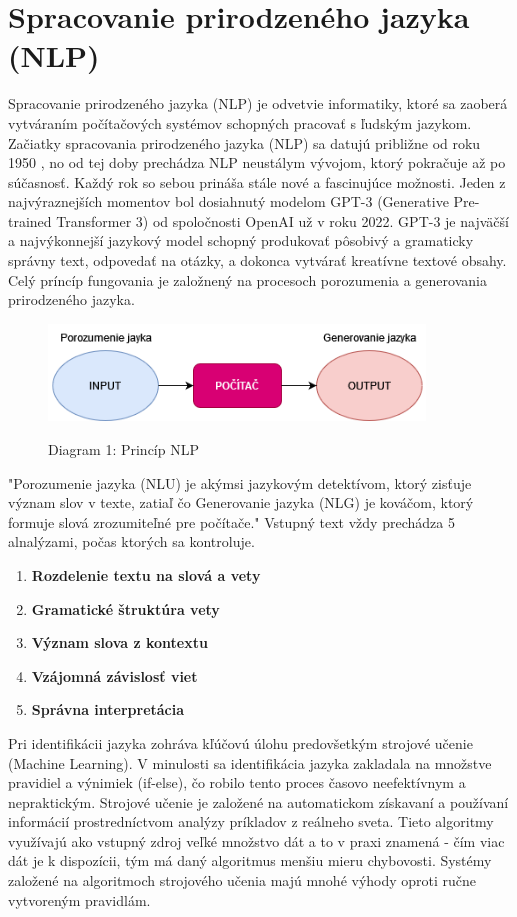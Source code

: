 \documentclass[10pt,slovak,a4paper]{article}
\begin{document}
\section{Spracovanie prirodzeného jazyka (NLP)} 
Spracovanie prirodzeného jazyka (NLP) je odvetvie informatiky, ktoré sa zaoberá vytváraním počítačových systémov schopných pracovať s ľudským jazykom. Začiatky spracovania prirodzeného jazyka (NLP) sa datujú približne od roku 1950 \cite{TechTarget:NLP}, no od tej doby prechádza NLP neustálym vývojom, ktorý pokračuje až po súčasnosť. Každý rok so sebou prináša stále nové a fascinujúce možnosti.
Jeden z najvýraznejších momentov bol dosiahnutý modelom GPT-3 (Generative Pre-trained Transformer 3) od spoločnosti OpenAI už v roku 2022. GPT-3 je najväčší a najvýkonnejší jazykový model schopný produkovať pôsobivý a gramaticky správny text, odpovedať na otázky, a dokonca vytvárať kreatívne textové obsahy. Celý príncíp fungovania je založnený na procesoch porozumenia a generovania prirodzeného jazyka.
\begin{figure}[h]
  \centering
  \includegraphics[width=10cm]{NLP.png}
  \caption{Diagram 1: Princíp NLP}
  \cite{sarhan2014smart}
\end{figure}

\leavevmode \newline
"Porozumenie jazyka (NLU) je akýmsi jazykovým detektívom, ktorý zisťuje význam slov v texte, zatiaľ čo Generovanie jazyka (NLG) je kováčom, ktorý formuje slová zrozumiteľné pre počítače."
\newline
\newline
Vstupný text vždy prechádza 5 alnalýzami, počas ktorých sa kontroluje.
\begin{enumerate}
    \item\textbf{Rozdelenie textu na slová a vety} 
    \item\textbf{Gramatické štruktúra vety}
    \item\textbf{Význam slova z kontextu}
    \item\textbf{Vzájomná závislosť viet} 
    \item\textbf{Správna interpretácia}
\end{enumerate}
\cite{builtin-nlp-intro}
\leavemode\newline
Pri identifikácii jazyka zohráva kľúčovú úlohu predovšetkým strojové učenie (Machine Learning). V minulosti sa identifikácia jazyka zakladala na množstve pravidiel a výnimiek (if-else), čo robilo tento proces časovo neefektívnym a nepraktickým. Strojové učenie je založené na automatickom získavaní a používaní informácií prostredníctvom analýzy príkladov z reálneho sveta. Tieto algoritmy využívajú ako vstupný zdroj veľké množstvo dát a to v praxi znamená - čím viac dát je k dispozícii, tým má daný algoritmus menšiu mieru chybovosti. Systémy založené na algoritmoch strojového učenia majú mnohé výhody oproti ručne vytvoreným pravidlám. 
\cite{chopra2013natural}
\end{document}
